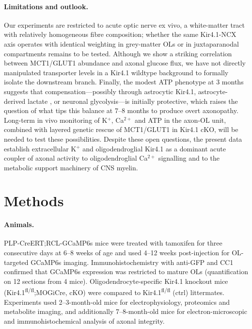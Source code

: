 \documentclass[11pt,a4paper]{article}
\begin{document}
\paragraph{Limitations and outlook.} Our experiments are restricted to acute optic nerve ex vivo, a white-matter tract with relatively homogeneous fibre composition; whether the same Kir4.1-NCX axis operates with identical weighting in grey-matter OLs or in juxtaparanodal compartments remains to be tested. Although we show a striking correlation between MCT1/GLUT1 abundance and axonal glucose flux, we have not directly manipulated transporter levels in a Kir4.1 wildtype background to formally isolate the downstream branch. Finally, the modest ATP phenotype at 3 months suggests that compensation---possibly through astrocytic Kir4.1, astrocyte-derived lactate \citep{Tekkok2005}, or neuronal glycolysis---is initially protective, which raises the question of what tips this balance at 7--8 months to produce overt axonopathy. Long-term in vivo monitoring of K$^+$, Ca$^{2+}$ and ATP in the axon-OL unit, combined with layered genetic rescue of MCT1/GLUT1 in Kir4.1 cKO, will be needed to test these possibilities. Despite these open questions, the present data establish extracellular K$^+$ and oligodendroglial Kir4.1 as a dominant acute coupler of axonal activity to oligodendroglial Ca$^{2+}$ signalling and to the metabolic support machinery of CNS myelin.

\section{Methods}

\paragraph{Animals.} PLP-CreERT;RCL-GCaMP6s mice were treated with tamoxifen for three consecutive days at 6--8 weeks of age and used 4--12 weeks post-injection for OL-targeted GCaMP6s imaging. Immunohistochemistry with anti-GFP and CC1 confirmed that GCaMP6s expression was restricted to mature OLs (quantification on 12 sections from 4 mice). Oligodendrocyte-specific Kir4.1 knockout mice (Kir4.1\textsuperscript{fl/fl};MOGiCre, cKO) were compared to Kir4.1\textsuperscript{fl/fl} (ctrl) littermates. Experiments used 2--3-month-old mice for electrophysiology, proteomics and metabolite imaging, and additionally 7--8-month-old mice for electron-microscopic and immunohistochemical analysis of axonal integrity.
\end{document}
